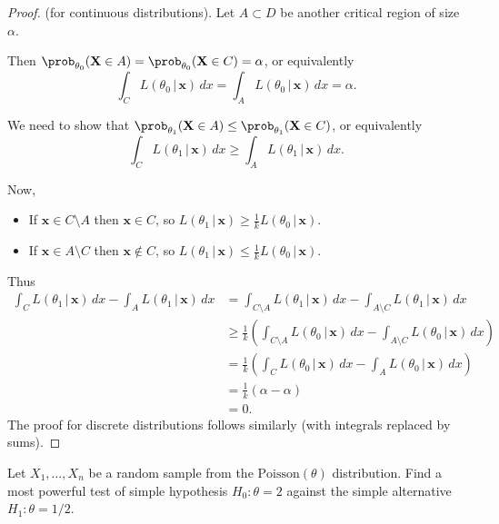 \begin{proof}(for continuous distributions).
Let $A\subset D$ be another critical region of size $\alpha$. 

\vspace*{1ex}
Then $\prob_{\theta_0}(\mathbf{X}\in A) = \prob_{\theta_0}(\mathbf{X}\in C)=\alpha$, or equivalently
\[
\int_C L(\theta_0\,|\,\mathbf{x})\,dx = \int_A L(\theta_0\,|\,\mathbf{x})\,dx = \alpha.
\]

\vspace*{2ex}
We need to show that $\prob_{\theta_1}(\mathbf{X}\in A) \leq \prob_{\theta_1}(\mathbf{X}\in C)$, or equivalently
\[
\int_C L(\theta_1\,|\,\mathbf{x})\,dx \geq \int_A L(\theta_1\,|\,\mathbf{x})\,dx.
\]

Now,
\begin{itemize}
\item If $\mathbf{x}\in C\setminus A$ then $\mathbf{x}\in C$, so $L(\theta_1\,|\,\mathbf{x}) \geq \displaystyle\frac{1}{k}L(\theta_0\,|\,\mathbf{x})$.
\item If $\mathbf{x}\in A\setminus C$ then $\mathbf{x}\notin C$, so  $L(\theta_1\,|\,\mathbf{x}) \leq \displaystyle\frac{1}{k}L(\theta_0\,|\,\mathbf{x})$.
\end{itemize}
Thus
\begin{align*}
\int_C L(\theta_1\,|\,\mathbf{x})\,dx - \int_A L(\theta_1\,|\,\mathbf{x})\,dx
	& = \int_{C\setminus A} L(\theta_1\,|\,\mathbf{x})\,dx - \int_{A\setminus C} L(\theta_1\,|\,\mathbf{x})\,dx \\
	& \geq \frac{1}{k}\left(\int_{C\setminus A} L(\theta_0\,|\,\mathbf{x})\,dx - \int_{A\setminus C} L(\theta_0\,|\,\mathbf{x})\,dx\right) \\
	& = \frac{1}{k}\left(\int_{C} L(\theta_0\,|\,\mathbf{x})\,dx - \int_{A} L(\theta_0\,|\,\mathbf{x})\,dx\right) \\
	& = \frac{1}{k}(\alpha-\alpha) \\
	& = 0.
\end{align*}	
The proof for discrete distributions follows similarly (with integrals replaced by sums).
\end{proof}


\begin{example}
Let $X_1,\ldots,X_n$ be a random sample from the $\text{Poisson}(\theta)$ distribution. Find a most powerful test of simple hypothesis $H_0:\theta=2$ against the simple alternative $H_1:\theta = 1/2$.
\end{example}

